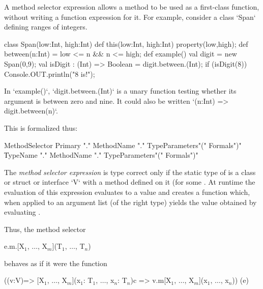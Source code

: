 A method selector expression allows a method to be used as a
first-class function, without writing a function expression for it.
For example, consider a class \xcd`Span` defining ranges of integers.  

\begin{xten}
class Span(low:Int, high:Int) {
  def this(low:Int, high:Int) {property(low,high);}
  def between(n:Int) = low <= n && n <= high;
  def example() {
    val digit = new Span(0,9);
    val isDigit : (Int) => Boolean = digit.between.(Int);
    if (isDigit(8)) Console.OUT.println("8 is!");
  }
}
\end{xten}
%
\noindent


In \xcd`example()`, 
\xcd`digit.between.(Int)` 
is a unary function testing whether its argument is between zero
and nine.  It could also be written 
\xcd`(n:Int) => digit.between(n)`.

This is formalized thus:

\begin{grammar}
MethodSelector \:
        Primary \xcd"."
        MethodName \xcd"."
                TypeParameters\opt \xcd"(" Formals\opt \xcd")" \\
      \|
        TypeName \xcd"."
        MethodName \xcd"."
                TypeParameters\opt \xcd"(" Formals\opt \xcd")" \\
\end{grammar}

The \emph{method selector expression}  is type
correct only if  the static type of  is a
class or struct or interface \xcd`V` with a method
 defined on it (for some
. At runtime the evaluation of this expression
evaluates  to a value  and creates a function 
which, when applied to an argument list  (of the right
type) yields the value obtained by evaluating .

Thus, the method selector

\begin{xtenmath}
e.m.[X$_1$, $\dots$, X$_m$](T$_1$, $\dots$, T$_n$)
\end{xtenmath}
\noindent behaves as if it were the function
\begin{xtenmath}
((v:V)=>
  [X$_1$, $\dots$, X$_m$](x$_1$: T$_1$, $\dots$, x$_n$: T$_n$){c} 
  => v.m[X$_1$, $\dots$, X$_m$](x$_1$, $\dots$, x$_n$))
(e)
\end{xtenmath}


